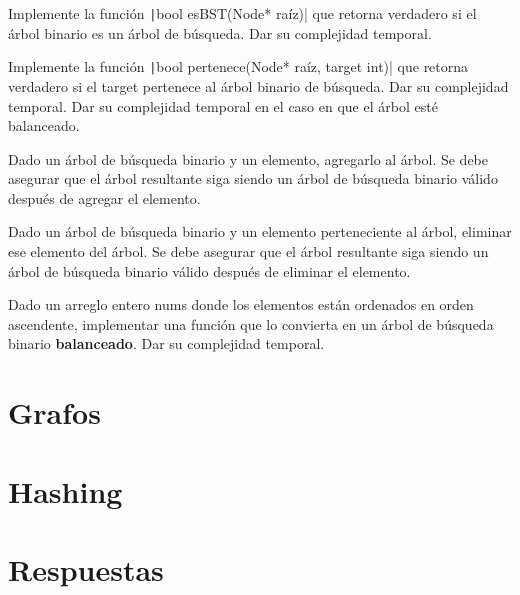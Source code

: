 \documentclass[titlepage,oneside]{book}
\begin{document}
\begin{Exercise}
   Implemente la función \texttt|bool esBST(Node* raíz)| que retorna verdadero si el árbol binario es un árbol de búsqueda. Dar su complejidad temporal.
\end{Exercise}

\begin{Exercise}
   Implemente la función \texttt|bool pertenece(Node* raíz, target int)| que retorna verdadero si el target pertenece al árbol binario de búsqueda.
   	\Question Dar su complejidad temporal.
	\Question Dar su complejidad temporal en el caso en que el árbol esté balanceado.
\end{Exercise}

\begin{Exercise}
   Dado un árbol de búsqueda binario y un elemento, agregarlo al árbol. Se debe asegurar que el árbol resultante siga siendo un árbol de búsqueda binario válido después de agregar el elemento.
\end{Exercise}

\begin{Exercise}
   Dado un árbol de búsqueda binario y un elemento perteneciente al árbol, eliminar ese elemento del árbol. Se debe asegurar que el árbol resultante siga siendo un árbol de búsqueda binario válido después de eliminar el elemento.
\end{Exercise}

\begin{Exercise}
   Dado un arreglo entero nums donde los elementos están ordenados en orden ascendente, implementar una función que lo convierta en un árbol de búsqueda binario \textbf{balanceado}. Dar su complejidad temporal.
\end{Exercise}



\chapter{Grafos}

\chapter{Hashing}

\chapter{Respuestas}
\shipoutAnswer

\printbibliography{}
\end{document}
